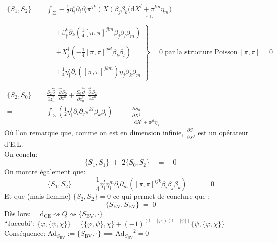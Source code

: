 \documentclass[a4paper,11pt]{article}
\renewcommand{\d}{{\mathrm{d}}}
\newcommand{\dr}[2]{\frac{\partial {#1}}{\partial{#2}}}
\begin{document}
\begin{align*}
\{S_1,S_2\} =& \int_\Sigma -\frac12 \eta^i_\dag \partial_i\partial_l \pi^{jk}(X) \beta_j\beta_k \Big(\underset{\mathrm{E}.\mathrm{L}.}{\d X^l + \pi^{lm}\eta_m}\Big)\\\\
&\quad \left.\begin{array}{l}
+ \beta^k_\dag \partial_k (\frac14 [\pi,\pi]^{jlm} \beta_j\beta_l\beta_m)\\\\
+ X^\dag_j (-\frac14 [\pi,\pi]^{jkl}\beta_k\beta_l)\\\\
+ \frac14\eta^i_\dag \partial_i \left([\pi,\pi]^{jkm}\right)\eta_j\beta_k\beta_m
\end{array}\right\} = 0 \; \mathrm{par}\;\mathrm{la}\;\mathrm{structure}\;\mathrm{Poisson}\; [\pi,\pi]=0\\\\
\{S_2,S_0\} =& \frac{S_2\overset\leftarrow\partial}{\partial z_n^\dag}\;\frac{\overset\to\partial S_0}{\partial z^n} + \frac{S_0\overset\leftarrow\partial}{\partial z_n^\dag}\;\frac{\overset\to\partial S_2}{\partial z^n}\\
=& \int_\Sigma \left(\frac12 \eta^i_\dag \partial_i\partial_j \pi^{kl} \beta_k\beta_l\right)\!\!\!\!\!\!\!\!\!\!\!\!\!\!\!\!\!\! \underset{\quad\quad\quad=\d X^j + \pi^{jk} \eta_k}{\dr{S_0}{X^j}}
\end{align*}
Où l'on remarque que, comme on est en dimension infinie, $\dr{S_0}{X^j}$ est un opérateur d'E.L.\\ On conclu:
$$\{S_1,S_1\}\;+\;2\{S_0,S_2\} \quad = \quad 0$$
On montre également que:
$$\{S_1,S_2\}\quad = \quad\frac14 \eta^l_\dag\eta^m_\dag\partial_l\partial_m \left([\pi,\pi]^{ijk}\beta_i\beta_j\beta_k\right) \quad = \quad 0$$
Et que (mais flemme) $\{S_2,S_2\} = 0$ ce qui permet de conclure que :
$$\boxed{\boxed{\{S_\mathrm{BV},S_\mathrm{BV}\} \; = \; 0}}$$
Dès lors: $\quad \d_\mathrm{CE} \rightsquigarrow Q \rightsquigarrow \{S_\mathrm{BV}, \cdot\}$\\
``Jaccobi": $\{\varphi,\{\psi, \chi\}\} = \{\{\varphi,\psi\},\chi\} + (-1)^{(1+|\varphi|)(1+|\psi|)}\{\psi,\{\varphi,\chi\}\}$\\
Conséquence: $\mathrm{Ad}_{S_\mathrm{BV}} := \{S_\mathrm{BV},\cdot\} \implies {\mathrm{Ad}_{S_\mathrm{BV}}}^2 = 0$
\end{document}
